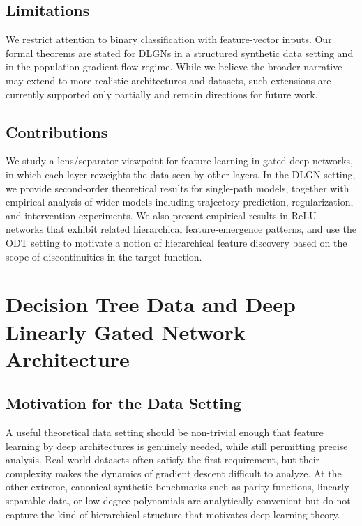\documentclass{article}
\theoremstyle{plain}
\theoremstyle{definition}
\theoremstyle{remark}
\newcommand{\1}{{\mathbf 1}}
\newcommand{\0}{{\mathbf 0}}
\renewcommand{\>}{{\rightarrow}}
\begin{document}
\subsection{Limitations}
We restrict attention to binary classification with feature-vector inputs. Our formal theorems are stated for DLGNs in a structured synthetic data setting and in the population-gradient-flow regime. While we believe the broader narrative may extend to more realistic architectures and datasets, such extensions are currently supported only partially and remain directions for future work.

\subsection{Contributions}

We study a lens/separator viewpoint for feature learning in gated deep networks, in which each layer reweights the data seen by other layers. In the DLGN setting, we provide second-order theoretical results for single-path models, together with empirical analysis of wider models including trajectory prediction, regularization, and intervention experiments. We also present empirical results in ReLU networks that exhibit related hierarchical feature-emergence patterns, and use the ODT setting to motivate a notion of hierarchical feature discovery based on the scope of discontinuities in the target function.

\section{Decision Tree Data and Deep Linearly Gated Network Architecture}

\subsection{Motivation for the Data Setting}

A useful theoretical data setting should be non-trivial enough that feature learning by deep architectures is genuinely needed, while still permitting precise analysis. Real-world datasets often satisfy the first requirement, but their complexity makes the dynamics of gradient descent difficult to analyze. At the other extreme, canonical synthetic benchmarks such as parity functions, linearly separable data, or low-degree polynomials \cite{Daniely+20, Frei+23, Soudry+18, Wu+23, Abbe+21} are analytically convenient but do not capture the kind of hierarchical structure that motivates deep learning theory.
\end{document}
